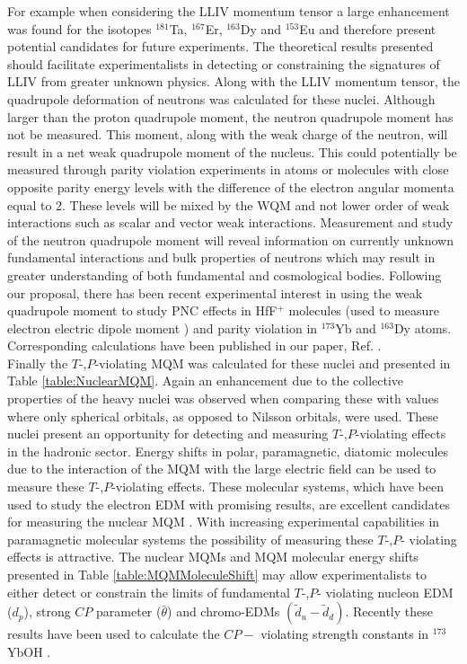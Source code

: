 \documentclass[10pt,a4paper, twoside, openright]{report}
\begin{document}
For example when considering the LLIV momentum tensor a large enhancement was found for the isotopes $^{181}$Ta, $^{167}$Er, $^{163}$Dy and $^{153}$Eu and therefore present potential candidates for future experiments. The theoretical results presented should facilitate experimentalists in detecting or constraining the signatures of LLIV from greater unknown physics. Along with the LLIV momentum tensor, the quadrupole deformation of neutrons was calculated for these nuclei. Although larger than the proton quadrupole moment, the neutron quadrupole moment has not be measured. This moment, along with the weak charge of the neutron, will result in a net weak quadrupole moment of the nucleus. This could potentially be measured through parity violation experiments in atoms or molecules with close opposite parity energy levels with the difference of the electron angular momenta equal to 2. These levels will be mixed by the WQM and not lower order of weak interactions such as scalar and vector weak interactions. Measurement and study of the neutron quadrupole moment will reveal information on currently unknown fundamental interactions and bulk properties of neutrons which may result in greater understanding of both fundamental and cosmological bodies. Following our proposal, there has been recent experimental interest in using the weak quadrupole moment to study PNC effects in HfF$^{+}$ molecules (used to measure electron electric dipole moment \cite{Cairncross2017}) and parity violation in $^{173}$Yb \cite{Antypas2017} and $^{163}$Dy \cite{Leefer2017} atoms. Corresponding calculations have been published in our paper, Ref. \cite{LFWQM2018}. \\
\linebreak
Finally the $T$-,$P$-violating MQM was calculated for these nuclei and presented in Table \ref{table:NuclearMQM}. Again an enhancement due to the collective properties of the heavy nuclei was observed when comparing these with values where only spherical orbitals, as opposed to Nilsson orbitals, were used. These nuclei present an opportunity for detecting and measuring $T$-,$P$-violating effects in the hadronic sector. Energy shifts in polar, paramagnetic, diatomic molecules due to the interaction of the MQM with the large electric field can be used to measure these $T$-,$P$-violating effects. These molecular systems, which have been used to study the electron EDM with promising results, are excellent candidates for measuring the nuclear MQM  \cite{Skripnikov2017, Skripnikov2014ThO}. With increasing experimental capabilities  in paramagnetic molecular systems the possibility of measuring these $T$-,$P$- violating effects is attractive. The nuclear MQMs and MQM molecular energy shifts presented in Table \ref{table:MQMMoleculeShift} may allow experimentalists to either detect or constrain the limits of fundamental $T$-,$P$- violating nucleon EDM ($d_p$), strong $CP$ parameter ($\bar{\theta}$) and chromo-EDMs $(\tilde{d}_{u} - \tilde{d}_d) $. Recently these results have been used to calculate the $CP-$ violating strength constants in $^{173}$YbOH \cite{MSF2019}.\\
\end{document}
